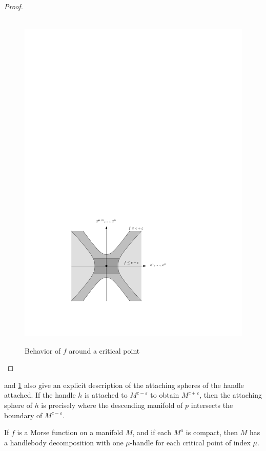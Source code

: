 \begin{proof}
\begin{figure}[tb]
\centering
\ \ \ \ \ \ \ \ \ \ \ \ \ \ \ \ \ \ \ \includegraphics[scale=1]{graphics/around-a-critical-point}
\caption{Behavior of $f$ around a critical point}
\label{around-a-critical-point}
\end{figure}
\end{proof}

 and \cref{around-a-critical-point} also give an explicit description of the attaching spheres of the handle attached. If the handle $h$ is attached to $M^{c-\varepsilon}$ to obtain $M^{c+\varepsilon}$, then the attaching sphere of $h$ is precisely where the descending manifold of $p$ intersects the boundary of $M^{c-\varepsilon}$.



\begin{thm}
\label{Morse handle decomposition}
If $f$ is a Morse function on a manifold $M$, and if each $M^a$ is compact, then $M$ has a handlebody decomposition with one $\mu$-handle for each critical point of index $\mu$.
\end{thm}




